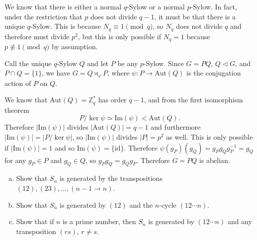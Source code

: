 \documentclass{article}
\newcounter{Problem}
\newenvironment{Problem}{\begin{Exercise}[name={Problem},
                                          counter={Problem}]}
                        {\end{Exercise}}
\begin{document}
\begin{Answer}
\begin{enumerate}
{    We know that there is either a normal $q$-Sylow or a normal
    $p$-Sylow. In fact, under the restriction that $p$ does not divide
    $q - 1$, it must be that there is a unique $q$-Sylow. This is
    because $N_q \equiv 1 \pmod{q}$, so $N_q$ does not divide $q$ and
    therefore must divide $p^2$, but this is only possible if $N_q =
    1$ because $p \not\equiv 1 \pmod{q}$ by assumption.

    Call the unique $q$-Sylow $Q$ and let $P$ be any $p$-Sylow.
    Since $G = PQ$, $Q \triangleleft G$, and $P \cap Q = \{ 1 \}$,
    we have $G = Q \rtimes_\psi P$, where $\psi : P \to
    \mathrm{Aut}(Q)$ is the conjugation action of $P$ on $Q$.

    We know that $\mathrm{Aut}(Q) = \mathbb{Z}_q^\ast$ has order $q -
    1$, and from the first isomorphism theorem
    $$
    P / \ker \psi \simeq \mathrm{Im}(\psi) < \mathrm{Aut}(Q).
    $$
    Therefore $|\mathrm{Im}(\psi)|$ divides
    $|\mathrm{Aut}(Q)| = q - 1$ and furthermore
    $|\mathrm{Im}(\psi)| = |P / \ker \psi|$, so $|\mathrm{Im}(\psi)|$
    divides $|P| = p^2$ as well. This is only possible if
    $|\mathrm{Im}(\psi)| = 1$ and so
    $\mathrm{Im}(\psi) = \{ \mathrm{id} \}$. Therefore
    $\psi(g_P)(g_Q) = g_P g_Q g_P^{-1} = g_Q$ for any $g_P \in P$ and
    $g_Q \in Q$, so $g_P g_Q = g_Q g_P$. Therefore $G = PQ$ is abelian.
  }
\end{enumerate}
\end{Answer}

\pagebreak

\begin{Problem}
  \begin{enumerate}[(a)]
    \item{
      Show that $S_n$ is generated by the transpositions
      $(12),(23),\dots,(n-1 \to n)$.
    }
    \item{
      Show that $S_n$ is generated by $(12)$ and the $n$-cycle
      $(12 \cdots n)$.
    }
    \item{
      Show that if $n$ is a prime number, then $S_n$ is generated by
      $(1 2 \cdots n)$ and any transposition $(rs)$, $r \neq s$.
    }
  \end{enumerate}
\end{Problem}
\end{document}
